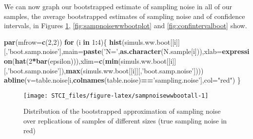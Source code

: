 \documentclass[]{book}
\newenvironment{Shaded}{\begin{snugshade}}{\end{snugshade}}
\newcommand{\KeywordTok}[1]{\textcolor[rgb]{0.13,0.29,0.53}{\textbf{#1}}}
\newcommand{\DataTypeTok}[1]{\textcolor[rgb]{0.13,0.29,0.53}{#1}}
\newcommand{\DecValTok}[1]{\textcolor[rgb]{0.00,0.00,0.81}{#1}}
\newcommand{\StringTok}[1]{\textcolor[rgb]{0.31,0.60,0.02}{#1}}
\newcommand{\ControlFlowTok}[1]{\textcolor[rgb]{0.13,0.29,0.53}{\textbf{#1}}}
\newcommand{\OperatorTok}[1]{\textcolor[rgb]{0.81,0.36,0.00}{\textbf{#1}}}
\newcommand{\NormalTok}[1]{#1}
\theoremstyle{definition}
\theoremstyle{definition}
\theoremstyle{definition}
\theoremstyle{remark}
\begin{document}
We can now graph our bootstrapped estimate of sampling noise in all of
our samples, the average bootstrapped estimates of sampling noise and of
confidence intervals, in Figures \ref{fig:sampnoisewwbootall},
\ref{fig:sampnoisewwbootplot} and \ref{fig:confintervalboot} show.

\begin{Shaded}
\begin{Highlighting}[]
\KeywordTok{par}\NormalTok{(}\DataTypeTok{mfrow=}\KeywordTok{c}\NormalTok{(}\DecValTok{2}\NormalTok{,}\DecValTok{2}\NormalTok{))}
\ControlFlowTok{for}\NormalTok{ (i }\ControlFlowTok{in} \DecValTok{1}\OperatorTok{:}\DecValTok{4}\NormalTok{)\{}
  \KeywordTok{hist}\NormalTok{(simuls.ww.boot[[i]][,}\StringTok{'boot.samp.noise'}\NormalTok{],}\DataTypeTok{main=}\KeywordTok{paste}\NormalTok{(}\StringTok{'N='}\NormalTok{,}\KeywordTok{as.character}\NormalTok{(N.sample[i])),}\DataTypeTok{xlab=}\KeywordTok{expression}\NormalTok{(}\KeywordTok{hat}\NormalTok{(}\DecValTok{2}\OperatorTok{*}\KeywordTok{bar}\NormalTok{(epsilon))),}\DataTypeTok{xlim=}\KeywordTok{c}\NormalTok{(}\KeywordTok{min}\NormalTok{(simuls.ww.boot[[i]][,}\StringTok{'boot.samp.noise'}\NormalTok{]),}\KeywordTok{max}\NormalTok{(simuls.ww.boot[[i]][,}\StringTok{'boot.samp.noise'}\NormalTok{])))}
  \KeywordTok{abline}\NormalTok{(}\DataTypeTok{v=}\NormalTok{table.noise[i,}\KeywordTok{colnames}\NormalTok{(table.noise)}\OperatorTok{==}\StringTok{'sampling.noise'}\NormalTok{],}\DataTypeTok{col=}\StringTok{"red"}\NormalTok{)}
\NormalTok{\}}
\end{Highlighting}
\end{Shaded}

\begin{figure}[htbp]

{\centering \texttt{[image: STCI\_files/figure-latex/sampnoisewwbootall-1]} 

}

\caption{Distribution of the bootstrapped approximation of sampling noise over replications of samples of different sizes (true sampling noise in red)}\label{fig:sampnoisewwbootall}
\end{figure}
\end{document}
